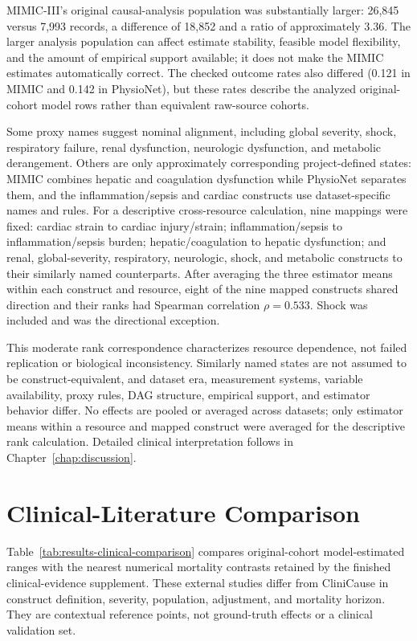 MIMIC-III's original causal-analysis population was substantially larger: 26,845 versus 7,993 records, a difference of 18,852 and a ratio of approximately 3.36.  The larger analysis population can affect estimate stability, feasible model flexibility, and the amount of empirical support available; it does not make the MIMIC estimates automatically correct.  The checked outcome rates also differed (0.121 in MIMIC and 0.142 in PhysioNet), but these rates describe the analyzed original-cohort model rows rather than equivalent raw-source cohorts.

Some proxy names suggest nominal alignment, including global severity, shock, respiratory failure, renal dysfunction, neurologic dysfunction, and metabolic derangement.  Others are only approximately corresponding project-defined states: MIMIC combines hepatic and coagulation dysfunction while PhysioNet separates them, and the inflammation/sepsis and cardiac constructs use dataset-specific names and rules.  For a descriptive cross-resource calculation, nine mappings were fixed: cardiac strain to cardiac injury/strain; inflammation/sepsis to inflammation/sepsis burden; hepatic/coagulation to hepatic dysfunction; and renal, global-severity, respiratory, neurologic, shock, and metabolic constructs to their similarly named counterparts.  After averaging the three estimator means within each construct and resource, eight of the nine mapped constructs shared direction and their ranks had Spearman correlation $\rho=0.533$.  Shock was included and was the directional exception.

This moderate rank correspondence characterizes resource dependence, not failed replication or biological inconsistency.  Similarly named states are not assumed to be construct-equivalent, and dataset era, measurement systems, variable availability, proxy rules, DAG structure, empirical support, and estimator behavior differ.  No effects are pooled or averaged across datasets; only estimator means within a resource and mapped construct were averaged for the descriptive rank calculation.  Detailed clinical interpretation follows in Chapter~\ref{chap:discussion}.

\section{Clinical-Literature Comparison}
\label{sec:results:clinical-literature-comparison}

Table~\ref{tab:results-clinical-comparison} compares original-cohort model-estimated ranges with the nearest numerical mortality contrasts retained by the finished clinical-evidence supplement.  These external studies differ from CliniCause in construct definition, severity, population, adjustment, and mortality horizon.  They are contextual reference points, not ground-truth effects or a clinical validation set.

